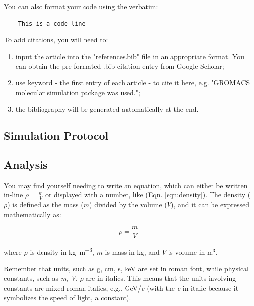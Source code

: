 \documentclass[a4paper,12pt]{scrarticle}
\begin{document}
You can also format your code using the verbatim:
\begin{verbatim}
    This is a code line
\end{verbatim}

To add citations, you will need to:
\begin{enumerate}
    \item input the article into the "references.bib" file in an appropriate format. You can obtain the pre-formated .bib citation entry from Google Scholar;
    \item use keyword - the first entry of each article - to cite it here, e.g. "GROMACS \cite{Berendsen1995Gromacs, Cygan2004, lemak1994berendsen} molecular simulation package was used.";
    \item the bibliography will be generated automatically at the end.
\end{enumerate}


\subsection*{Simulation Protocol}
\textbf{\color{blue}{Include relevant run information for energy minimization, equilibration, and production runs. Provide details such as run type algorithm, time step, temperature, pressure, simulation length, etc.}}


\subsection*{Analysis}
\textbf{\color{blue}{Explain how you ensured system equilibration within the analyzed time frame. Describe the analysis performed on trajectories, including software used, tools, parameters, and preparation of plots or renderings.}}

You may find yourself needing to write an equation, which can either be written in-line $\rho = \frac{m}{V}$ or displayed with a number, like (Eqn. \ref{eqn:density}). The density ($\rho$) is defined as the mass ($m$) divided by the volume ($V$), and it can be expressed mathematically as:

\begin{equation}
    \rho = \frac{m}{V}
    \label{eqn:density}
\end{equation}

where $\rho$ is density in \si{\kilo\gram\per\cubic\meter}, $m$ is mass in kg, and $V$ is volume in m$^3$.

Remember that units, such as g, cm, s, keV are set in roman font, while physical constants, such as \emph{m}, \emph{V}, $\rho$ are in italics. This means that the units involving constants are mixed roman-italics, e.g., GeV/\emph{c} (with the \emph{c} in italic because it symbolizes the speed of light, a constant).
\end{document}
